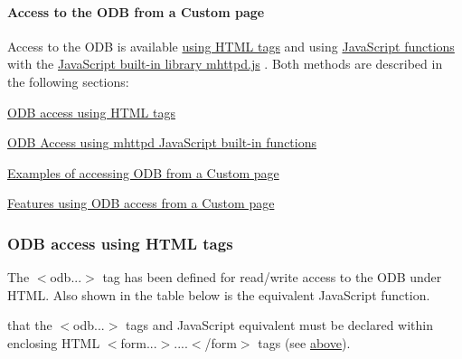 \paragraph{Access to the ODB from a Custom page}\label{RC_mhttpd_custom_ODB_access}
\par




\par


Access to the ODB is available \hyperlink{RC_mhttpd_custom_ODB_access_RC_mhttpd_custom_odb_html}{using HTML tags} and using \hyperlink{RC_mhttpd_custom_ODB_access_RC_mhttpd_custom_odb_js}{JavaScript functions} with the \hyperlink{RC_mhttpd_custom_js_lib}{JavaScript built-\/in library mhttpd.js} . Both methods are described in the following sections:


\begin{DoxyItemize}
\item \hyperlink{RC_mhttpd_custom_ODB_access_RC_mhttpd_custom_odb_html}{ODB access using HTML tags}
\item \hyperlink{RC_mhttpd_custom_ODB_access_RC_mhttpd_custom_odb_js}{ODB Access using mhttpd JavaScript built-\/in functions}
\item \hyperlink{RC_mhttpd_custom_ODB_access_examples}{Examples of accessing ODB from a Custom page}
\item \hyperlink{RC_mhttpd_custom_ODB_access_features}{Features using ODB access from a Custom page}
\end{DoxyItemize}

\label{RC_mhttpd_custom_ODB_access_idx_odb-HTML-tag}
\hypertarget{RC_mhttpd_custom_ODB_access_idx_odb-HTML-tag}{}
 \hypertarget{RC_mhttpd_custom_ODB_access_RC_mhttpd_custom_odb_html}{}\subsubsection{ODB access using HTML tags}\label{RC_mhttpd_custom_ODB_access_RC_mhttpd_custom_odb_html}
The $<$odb...$>$ tag has been defined for read/write access to the ODB under HTML. Also shown in the table below is the equivalent JavaScript function.

that the $<$odb...$>$ tags and JavaScript equivalent must be declared within enclosing HTML $<$form...$>$....$<$/form$>$  tags (see \hyperlink{RC_mhttpd_custom_features_RC_mhttpd_custom_key_access}{above}).

